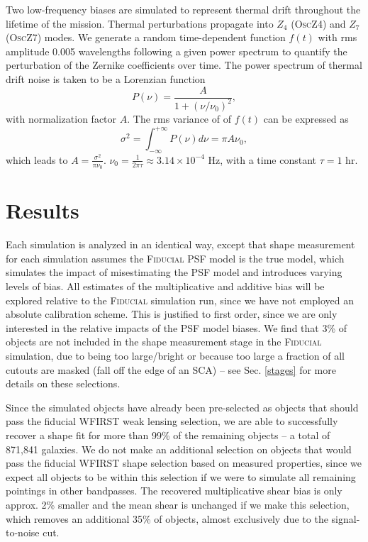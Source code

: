 \documentclass[aps,prd, amsmath,amssymb,superscriptaddress,showkeys,nofootinbib,reprint,preprintnumbers]{revtex4-1}
\begin{document}
Two low-frequency biases are simulated to represent thermal drift throughout the lifetime of the mission. Thermal perturbations propagate into $Z_4$ (\textsc{OscZ4})  and $Z_7$ (\textsc{OscZ7}) modes.
We generate a random time-dependent function $f(t)$ with rms amplitude 0.005 wavelengths following a given power spectrum to quantify the perturbation of the Zernike coefficients over time. 
The power spectrum of thermal drift noise is taken to be a Lorenzian function 
\begin{equation}
P(\nu)=\frac{A}{1+(\nu/\nu_0)^2},
\end{equation}
with normalization factor $A$. The rms variance of of $f(t)$ can be expressed as
\begin{equation}
\sigma^2 = \int_{-\infty}^{+\infty}P(\nu)d\nu=\pi A\nu_0,
\end{equation}
which leads to $A=\frac{\sigma^2}{\pi\nu_0}$. $\nu_0=\frac{1}{2\pi\tau}\approx 3.14\times10^{-4}$ Hz, with a time constant $\tau=1$ hr.

\section{Results}\label{sec:results2}

Each simulation is analyzed in an identical way, except that shape measurement for each simulation assumes the \textsc{Fiducial} PSF model is the true model, which simulates the impact of misestimating the PSF model and introduces varying levels of bias. 
All estimates of the multiplicative and additive bias will be explored relative to the \textsc{Fiducial} simulation run, since we have not employed an absolute calibration scheme. 
This is justified to first order, since we are only interested in the relative impacts of the PSF model biases.
We find that 3\% of objects are not included in the shape measurement stage in the \textsc{Fiducial} simulation, due to being too large/bright or because too large a fraction of all cutouts are masked (fall off the edge of an SCA) -- see Sec. \ref{stages} for more details on these selections. 

Since the simulated objects have already been pre-selected as objects that should pass the fiducial WFIRST weak lensing selection, we are able to successfully recover a shape fit for more than 99\% of the remaining objects -- a total of 871,841 galaxies. 
We do not make an additional selection on objects that would pass the fiducial WFIRST shape selection based on measured properties, since we expect all objects to be within this selection if we were to simulate all remaining pointings in other bandpasses. 
The recovered multiplicative shear bias is only approx. 2\% smaller and the mean shear is unchanged if we make this selection, which removes an additional 35\% of objects, almost exclusively due to the signal-to-noise cut.
\end{document}

